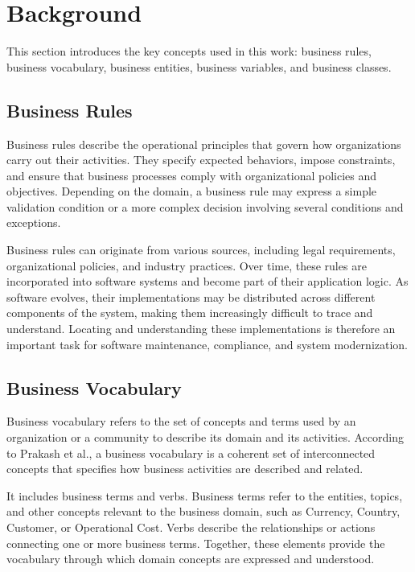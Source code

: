 \section{Background}
\label{sec:background}

This section introduces the key concepts used in this work: business rules, business vocabulary, business entities, business variables, and business classes.

\subsection{Business Rules}

Business rules describe the operational principles that govern how organizations carry out their activities\cite{Huan96a}. They specify expected behaviors, impose constraints, and ensure that business processes comply with organizational policies and objectives. Depending on the domain, a business rule may express a simple validation condition or a more complex decision involving several conditions and exceptions.

Business rules can originate from various sources, including legal requirements, organizational policies, and industry practices. Over time, these rules are incorporated into software systems and become part of their application logic\cite{Wang08b}. As software evolves, their implementations may be distributed across different components of the system, making them increasingly difficult to trace and understand\cite{Cose13a}. Locating and understanding these implementations is therefore an important task for software maintenance, compliance, and system modernization.

\subsection{Business Vocabulary}

Business vocabulary refers to the set of concepts and terms used by an organization or a community to describe its domain and its activities. According to Prakash et al.\cite{Prak21a}, a business vocabulary is a coherent set of interconnected concepts that specifies how business activities are described and related.

It includes business terms and verbs. Business terms refer to the entities, topics, and other concepts relevant to the business domain, such as Currency, Country, Customer, or Operational Cost. Verbs describe the relationships or actions connecting one or more business terms\cite{Prak21a}. Together, these elements provide the vocabulary through which domain concepts are expressed and understood.


